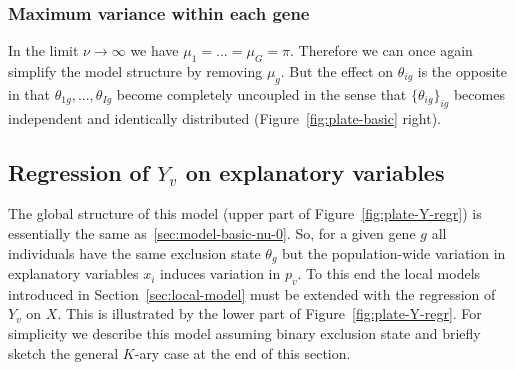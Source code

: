 \documentclass[letterpaper]{article}
\begin{document}
\subsubsection{Maximum variance within each gene}
\label{sec:model-basic-nu-infinit}

In the limit \(\nu\rightarrow\infty\) we have \(\mu_1=...=\mu_G=\pi\).
Therefore we can once again simplify the model structure by removing
\(\mu_g\).  But the effect on \(\theta_{ig}\) is the opposite in that
\(\theta_{1g},...,\theta_{Ig}\) become completely uncoupled in the sense that
\(\{\theta_{ig}\}_{ig}\) becomes independent and identically distributed
(Figure~\ref{fig:plate-basic} right).

\subsection{Regression of \(Y_v\) on explanatory variables }
\label{sec:model-Y-regr}

The global structure of this model (upper part of Figure~\ref{fig:plate-Y-regr}) is essentially the same as~\ref{sec:model-basic-nu-0}.
So, for a given gene \(g\) all individuals have the same exclusion state
\(\theta_g\) but the population-wide variation in explanatory variables
\(x_i\) induces variation in \(p_v\).  To this end the local models introduced
in Section~\ref{sec:local-model} must be extended with the regression of
\(Y_v\) on \(X\).  This is illustrated by the lower part of
Figure~\ref{fig:plate-Y-regr}.  For simplicity we describe this model assuming binary
exclusion state and briefly sketch the general \(K\)-ary case at the end of
this section.
\end{document}
